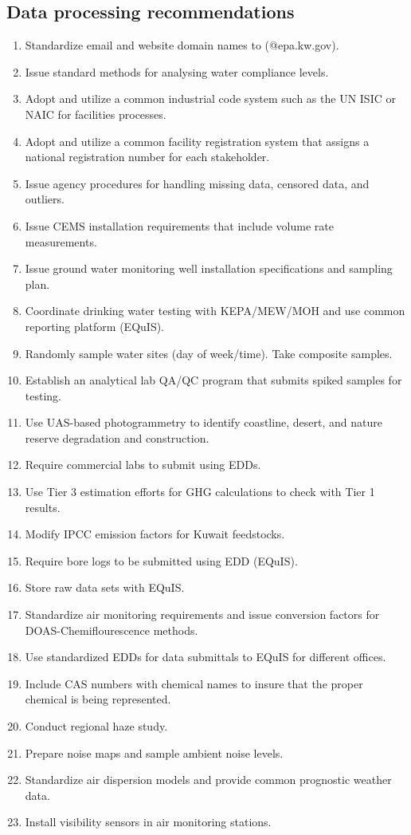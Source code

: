 \subsection{Data processing recommendations}
\begin{enumerate}
\item Standardize email and website domain names to (@epa.kw.gov). 
\item Issue standard methods for analysing water compliance levels.
\item Adopt and utilize a common industrial code system such as the UN ISIC or NAIC for facilities processes.
\item Adopt and utilize a common facility registration system that assigns a national registration number for each stakeholder.
\item Issue agency procedures for handling missing data, censored data, and outliers.
\item Issue CEMS installation requirements that include volume rate measurements.
\item Issue ground water monitoring well installation specifications and sampling plan.
\item Coordinate drinking water testing with KEPA/MEW/MOH and use common reporting platform (EQuIS).
\item Randomly sample water sites (day of week/time). Take composite samples.
\item Establish an analytical lab QA/QC program that submits spiked samples for testing.
\item Use UAS-based photogrammetry to identify coastline, desert, and nature reserve degradation and construction.
\item Require commercial labs to submit using EDDs.
\item Use Tier 3 estimation efforts for GHG calculations to check with Tier 1 results.
\item Modify IPCC emission factors for Kuwait feedstocks.
\item Require bore logs to be submitted using EDD (EQuIS).
\item Store raw data sets with EQuIS.
\item Standardize air monitoring requirements and issue conversion factors for DOAS-Chemiflourescence methods.
\item Use standardized EDDs for data submittals to EQuIS for different offices.
\item Include CAS numbers with chemical names to insure that the proper chemical is being represented.
\item Conduct regional haze study.
\item Prepare noise maps and sample ambient noise levels.
\item Standardize air dispersion models and provide common prognostic weather data.
\item Install visibility sensors in air monitoring stations.
\end{enumerate}

